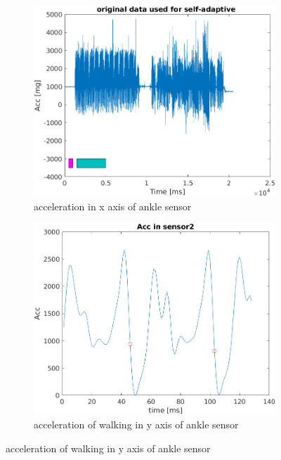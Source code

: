 \documentclass[article]{article}
\begin{document}
\begin{figure}
	
	
	\begin{subfigure}[b]{0.47\textwidth}
		\centering
		\includegraphics[width=\textwidth]{training_data_s2_p2}
		\caption{acceleration in x axis of ankle sensor}
		\label{ori}
	\end{subfigure}
	\hfill
	\begin{subfigure}[b]{0.47\textwidth}
		\centering
		\includegraphics[width=\textwidth]{acc_step_s1_p2}
		\caption{acceleration of walking in y axis of ankle sensor}
		\label{step}
	\end{subfigure}
	\hfill
	

\end{figure}
\end{document}
